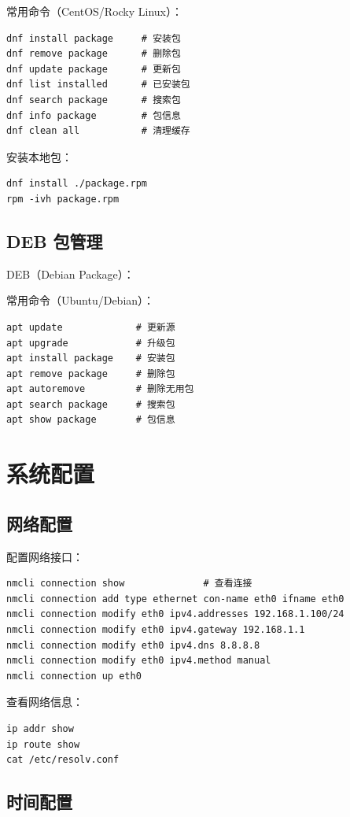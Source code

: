 \documentclass[12pt,UTF8]{ctexbook}
\begin{document}
常用命令（CentOS/Rocky Linux）：
\begin{verbatim}
dnf install package     # 安装包
dnf remove package      # 删除包
dnf update package      # 更新包
dnf list installed      # 已安装包
dnf search package      # 搜索包
dnf info package        # 包信息
dnf clean all           # 清理缓存
\end{verbatim}

安装本地包：
\begin{verbatim}
dnf install ./package.rpm
rpm -ivh package.rpm
\end{verbatim}

\section{DEB 包管理}
\label{sec:deb_management}

DEB（Debian Package）：

常用命令（Ubuntu/Debian）：
\begin{verbatim}
apt update             # 更新源
apt upgrade            # 升级包
apt install package    # 安装包
apt remove package     # 删除包
apt autoremove         # 删除无用包
apt search package     # 搜索包
apt show package       # 包信息
\end{verbatim}

\chapter{系统配置}
\label{chap:system_config}

\section{网络配置}
\label{sec:network_config}

配置网络接口：
\begin{verbatim}
nmcli connection show              # 查看连接
nmcli connection add type ethernet con-name eth0 ifname eth0
nmcli connection modify eth0 ipv4.addresses 192.168.1.100/24
nmcli connection modify eth0 ipv4.gateway 192.168.1.1
nmcli connection modify eth0 ipv4.dns 8.8.8.8
nmcli connection modify eth0 ipv4.method manual
nmcli connection up eth0
\end{verbatim}

查看网络信息：
\begin{verbatim}
ip addr show
ip route show
cat /etc/resolv.conf
\end{verbatim}

\section{时间配置}
\label{sec:time_config}
\end{document}
